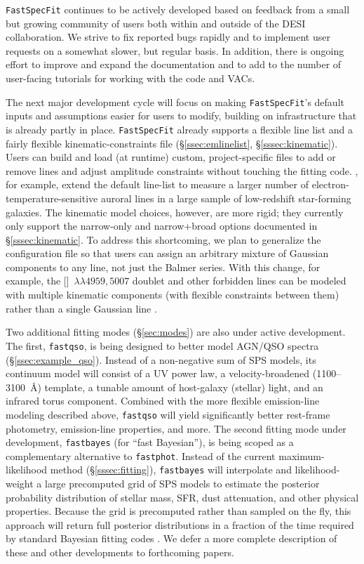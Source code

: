 \documentclass[modern,linenumbers]{aastex702}
\newcommand{\fastspecfit}{\texttt{FastSpecFit}}
\newcommand{\oiiidoublet}{[\ion{O}{3}]~$\lambda\lambda4959,5007$}
\begin{document}
\fastspecfit{} continues to be actively developed based on feedback
from a small but growing community of users both within and outside of
the DESI collaboration. We strive to fix reported bugs rapidly and to
implement user requests on a somewhat slower, but regular basis. In
addition, there is ongoing effort to improve and expand the
documentation and to add to the number of user-facing tutorials for
working with the code and VACs.

The next major development cycle will focus on making \fastspecfit{}'s
default inputs and assumptions easier for users to modify, building on
infrastructure that is already partly in place.  \fastspecfit{}
already supports a flexible line list and a fairly flexible
kinematic-constraints file (\S\ref{ssec:emlinelist},
\S\ref{sssec:kinematic}). Users can build and load (at runtime)
custom, project-specific files to add or remove lines and adjust
amplitude constraints without touching the fitting
code. \citet{scholte26a}, for example, extend the default line-list to
measure a larger number of electron-temperature-sensitive auroral
lines in a large sample of low-redshift star-forming galaxies. The
kinematic model choices, however, are more rigid; they currently only
support the narrow-only and narrow+broad options documented in
\S\ref{sssec:kinematic}. To address this shortcoming, we plan to
generalize the configuration file so that users can assign an
arbitrary mixture of Gaussian components to any line, not just the
Balmer series. With this change, for example, the \oiiidoublet{}
doublet and other forbidden lines can be modeled with multiple
kinematic components (with flexible constraints between them) rather
than a single Gaussian line \citep[e.g.,][]{harrison14a, pucha25a}.

Two additional fitting modes (\S\ref{sec:modes}) are also under active
development. The first, \texttt{fastqso}, is being designed to better
model AGN/QSO spectra (\S\ref{ssec:example_qso}). Instead of a
non-negative sum of SPS models, its continuum model will consist of a
UV power law, a velocity-broadened  (1100--3100~\AA)
template, a tunable amount of host-galaxy (stellar) light, and an
infrared torus component. Combined with the more flexible
emission-line modeling described above, \texttt{fastqso} will yield
significantly better rest-frame photometry, emission-line properties,
and more. The second fitting mode under development,
\texttt{fastbayes} (for ``fast Bayesian''), is being scoped as a
complementary alternative to \texttt{fastphot}. Instead of the current
maximum-likelihood method (\S\ref{sssec:fitting}), \texttt{fastbayes}
will interpolate and likelihood-weight a large precomputed grid of SPS
models to estimate the posterior probability distribution of stellar
mass, SFR, dust attenuation, and other physical properties. Because
the grid is precomputed rather than sampled on the fly, this approach
will return full posterior distributions in a fraction of the time
required by standard Bayesian fitting codes
\citep[e.g.,][]{johnson21a}. We defer a more complete description of
these and other developments to forthcoming papers.
\end{document}
